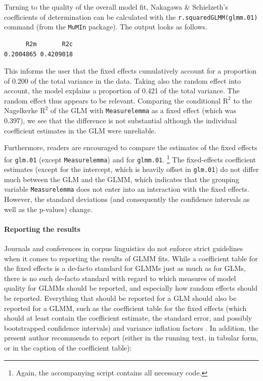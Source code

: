 Turning to the quality of the overall model fit, Nakagawa \& Schielzeth's coefficients of determination can be calculated with the \texttt{r.squaredGLMM(glmm.01)} command (from the \texttt{MuMIn} package).
The output looks as follows.

\vspace{0.5\baselineskip}

\begin{lstlisting}
      R2m       R2c
0.2004865 0.4209018
\end{lstlisting}

This informs the user that the fixed effects cumulatively account for a proportion of 0.200 of the total variance in the data.
Taking also the random effect into account, the model explains a proportion of 0.421 of the total variance.
The random effect thus appears to be relevant.
Comparing the conditional $\textrm{R}^{\textrm{2}}$ to the Nagelkerke $\textrm{R}^{\textrm{2}}$ of the GLM with \texttt{Measurelemma} as a fixed effect (which was 0.397), we see that the difference is not substantial although the individual coefficient estimates in the GLM were unreliable.

Furthermore, readers are encouraged to compare the estimates of the fixed effects for \texttt{glm.01} (except \texttt{Measurelemma}) and for \texttt{glmm.01}.%
\footnote{Again, the accompanying script contains all necessary code.}
The fixed-effects coefficient estimates (except for the intercept, which is heavily offset in \texttt{glm.01}) do not differ much between the GLM and the GLMM, which indicates that the grouping variable \texttt{Measurelemma} does not enter into an interaction with the fixed effects.
However, the standard deviations (and consequently the confidence intervals as well as the p-values) change.

\paragraph{Reporting the results}

Journals and conferences in corpus linguistics do not enforce strict guidelines when it comes to reporting the results of GLMM fits.
While a coefficient table for the fixed effects is a de-facto standard for GLMMs just as much as for GLMs, there is no such de-facto standard with regard to which measures of model quality for GLMMs should be reported, and especially how random effects should be reported.
Everything that should be reported for a GLM should also be reported for a GLMM, such as the coefficient table for the fixed effects (which should at least contain the coefficient estimate, the standard error, and possibly bootstrapped confidence intervals) and variance inflation factors \citep{FoxMonette1992,ZuurEa2010}.
In addition, the present author recommends to report (either in the running text, in tabular form, or in the caption of the coefficient table):

